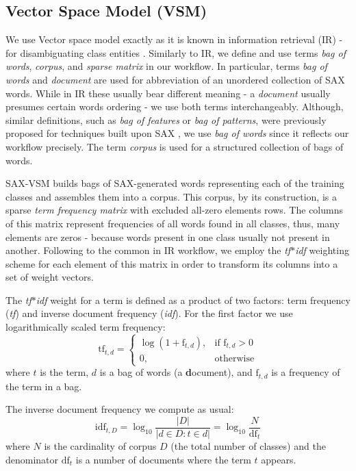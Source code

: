 \documentclass{llncs}
\begin{document}
\subsection{Vector Space Model (VSM)}
We use Vector space model exactly as it is known in information retrieval (IR) - 
for disambiguating class entities \cite{salton}. Similarly to IR, we define and use 
terms \textit{bag of words}, \textit{corpus}, and \textit{sparse matrix} in our workflow. 
In particular, terms \textit{bag of words} and \textit{document} are used 
for abbreviation of an unordered collection of SAX words. While in IR these 
usually bear different meaning - a \textit{document} usually presumes certain 
words ordering - we use both terms  interchangeably. 
Although, similar definitions, such as \textit{bag of features} or 
\textit{bag of patterns}, were previously proposed for techniques built upon 
SAX \cite{bag_patterns}, we use \textit{bag of words} since it reflects our 
workflow precisely. The term \textit{corpus} is used for a structured collection 
of bags of words. 

SAX-VSM builds bags of SAX-generated words representing each of the training 
classes and assembles them into a corpus. This corpus, by its construction, 
is a sparse \textit{term frequency matrix} with excluded all-zero elements rows. 
The columns of this matrix represent frequencies of all words found in all classes, 
thus, many elements are zeros - because words present in one class usually not present in another. 
Following to the common in IR workflow, we employ the \textit{tf$\ast$idf} weighting scheme 
for each element of this matrix in order to transform its columns into a set of weight vectors. 

The \textit{tf$\ast$idf} weight for a term is defined as a product of two factors: 
term frequency (\textit{tf}) and inverse document frequency (\textit{idf}). 
For the first factor we use logarithmically scaled term frequency:
\begin{equation}
 \mbox{tf}_{t, d} =  \begin{cases} \log(1 + \mbox{f}_{t,d}), &\mbox{if f}_{t,d}>0  \\
0, & \mbox{otherwise} \end{cases}
\end{equation} 
where $t$ is the term, $d$ is a bag of words (a \textbf{d}ocument), and $\mbox{f}_{t,d}$ 
is a frequency of the term in a bag.

The inverse document frequency we compute as usual:
\begin{equation}
 \mbox{idf}_{t, D} =  \log_{10}\frac{|D|}{|d \in D : t \in d|} = \log_{10}\frac{N}{\mbox{df}_{t}}
\end{equation} 
where $N$ is the cardinality of corpus $D$ (the total number of classes) and the 
denominator $\mbox{df}_{t}$ is a number of documents where the term $t$ appears.
\end{document}
